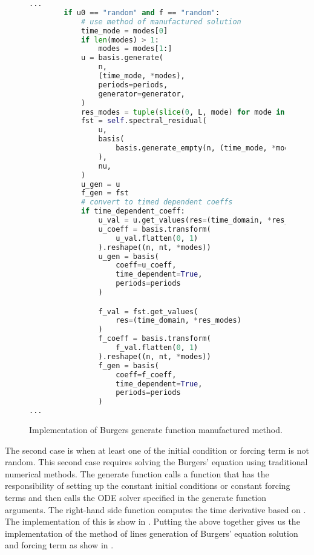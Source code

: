 \begin{figure}[H]
  \centering
  \begin{lstlisting}[language=Python]
...
        if u0 == "random" and f == "random":
            # use method of manufactured solution
            time_mode = modes[0]
            if len(modes) > 1:
                modes = modes[1:]
            u = basis.generate(
                n,
                (time_mode, *modes),
                periods=periods,
                generator=generator,
            )
            res_modes = tuple(slice(0, L, mode) for mode in modes)
            fst = self.spectral_residual(
                u,
                basis(
                    basis.generate_empty(n, (time_mode, *modes))
                ),
                nu,
            )
            u_gen = u
            f_gen = fst
            # convert to timed dependent coeffs
            if time_dependent_coeff:
                u_val = u.get_values(res=(time_domain, *res_modes))
                u_coeff = basis.transform(
                    u_val.flatten(0, 1)
                ).reshape((n, nt, *modes))
                u_gen = basis(
                    coeff=u_coeff,
                    time_dependent=True,
                    periods=periods
                )

                f_val = fst.get_values(
                    res=(time_domain, *res_modes)
                )
                f_coeff = basis.transform(
                    f_val.flatten(0, 1)
                ).reshape((n, nt, *modes))
                f_gen = basis(
                    coeff=f_coeff,
                    time_dependent=True,
                    periods=periods
                )
...
  \end{lstlisting}
  \caption{Implementation of Burgers generate function manufactured method.}\label{fig:burgers_generate_manufactured_impl}
\end{figure}

The second case is when at least one of the initial condition or forcing term is not random. This second case requires solving the Burgers' equation using traditional numerical methods. The generate function calls a function that has the responsibility of setting up the constant initial conditions or constant forcing terms and then calls the ODE solver specified in the generate function arguments. The right-hand side function computes the time derivative based on . The implementation of this is show in . Putting the above together gives us the implementation of the method of lines generation of Burgers' equation solution and forcing term as show in .

